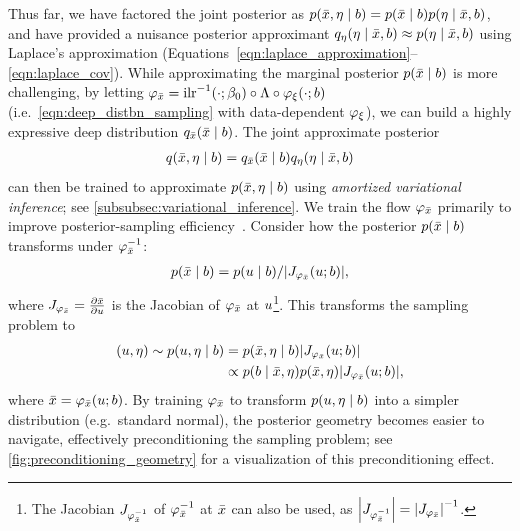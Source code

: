 Thus far, we have factored the joint posterior as $p(\bar{x}, \eta \mid b) = p(\bar{x} \mid b) p(\eta \mid \bar{x}, b)$, and have provided a nuisance posterior approximant $q_{\eta}(\eta \mid \bar{x}, b) \approx p(\eta \mid \bar{x}, b)$ using Laplace's approximation (Equations~\eqref{eqn:laplace_approximation}--\eqref{eqn:laplace_cov}).
While approximating the marginal posterior $p(\bar{x} \mid b)$ is more challenging,
by letting $\varphi_{\bar{\distbn}} = \InvILR{\cdot; \beta_{0}} \circ \Lambda \circ \varphi_{\vv{\xi}}(\cdot; \signal)$ (i.e.~\eqref{eqn:deep_distbn_sampling} with data-dependent $\varphi_{\xi}$), we can build a highly expressive deep distribution $q_{\bar{x}}(\bar{x} \mid b)$.
The joint approximate posterior
\begin{align}\label{eqn:joint_approx_posterior}
    q(\bar{x}, \eta \mid b) = q_{\bar{x}}(\bar{x} \mid b) q_{\eta}(\eta \mid \bar{x}, b)
\end{align}
can then be trained to approximate $p(\bar{x}, \eta \mid b)$ using \textit{amortized variational inference};
see \cref{subsubsec:variational_inference}.
We train the flow $\varphi_{\bar{x}}$ primarily to improve posterior-sampling efficiency~\citep{parno_transport_2018,hoffman_neutra-lizing_2019,muller_neural_2019,papamakarios_normalizing_2021}.
Consider how the posterior $p(\bar{x} \mid b)$ transforms under $\varphi_{\bar{x}}^{-1}$:
\begin{align}\label{eqn:density_change_of_vars}
    p(\bar{\distbn} \mid \signal) = p(\vv{u} \mid \signal) / \AbsDet{\vv{J}_{\varphi_{\bar{\distbn}}}(\vv{u}; \signal)},
\end{align}
where $J_{\varphi_{\bar{x}}} = \frac{\partial \bar{x}}{\partial u}$ is the Jacobian of $\varphi_{\bar{x}}$ at $u$\footnote{The Jacobian $J_{\varphi_{\bar{x}}^{-1}}$ of $\varphi_{\bar{x}}^{-1}$ at $\bar{x}$ can also be used, as $\left\lvert J_{\varphi_{\bar{x}}^{-1}}\right\rvert = \left\lvert J_{\varphi_{\bar{x}}}\right\rvert^{-1}$.}.
This transforms the sampling problem to
\begin{align}\label{eqn:posterior_sampling_uspace}
    \begin{split}
        (\vv{u}, \eta) \sim p(\vv{u}, \eta \mid \signal) & = p(\bar{\distbn}, \eta \mid \signal) \AbsDet{\vv{J}_{\varphi_{\bar{\distbn}}}(\vv{u}; \signal)} \\
        & \propto p(\signal \mid \bar{\distbn}, \eta) p(\bar{\distbn}, \eta)
        \AbsDet{\vv{J}_{\varphi_{\bar{\distbn}}}(\vv{u}; \signal)},
    \end{split}
\end{align}
where $\bar{x} = \varphi_{\bar{x}}(u; b)$.
By training $\varphi_{\bar{x}}$ to transform $p(u,\eta \mid b)$ into a simpler distribution (e.g.\ standard normal), the posterior geometry becomes easier to navigate, effectively preconditioning the sampling problem;
see \cref{fig:preconditioning_geometry} for a visualization of this preconditioning effect.

